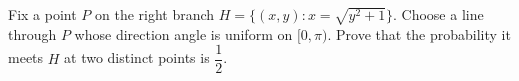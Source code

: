 Fix a point $P$ on the right branch $H=\{(x,y):x=\sqrt{y^2+1}\}$. Choose a line through $P$ whose direction angle is uniform on $[0,\pi)$. Prove that the probability it meets $H$ at two distinct points is $\dfrac{1}{2}$.
